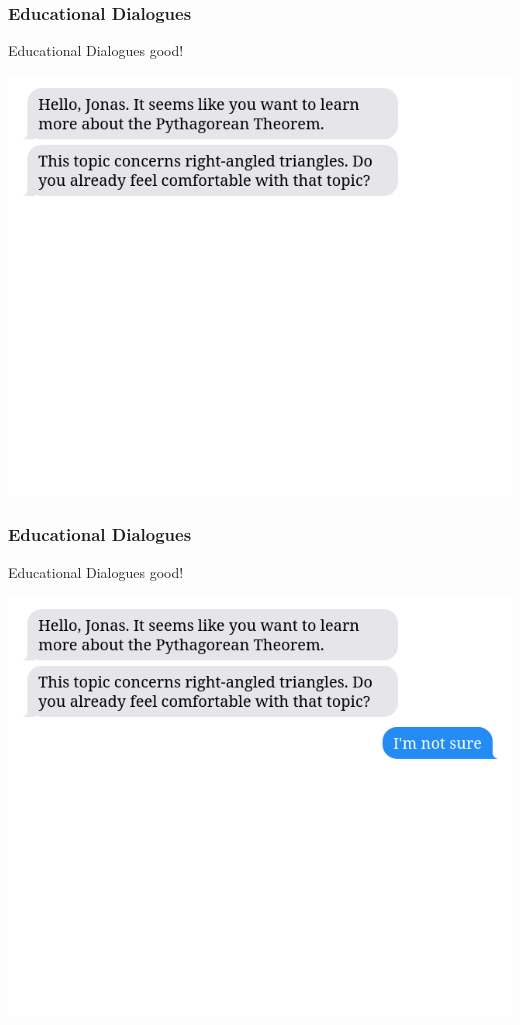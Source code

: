 \documentclass[aspectratio=169, usenames, dvipsnames]{beamer}
\begin{document}
\begin{frame}
\frametitle{Educational Dialogues}
\begin{minipage}{0.4\textwidth}
Educational Dialogues good!
\end{minipage}%
\begin{minipage}{0.6\textwidth}
\pause
\includegraphics[height=0.75\textheight,keepaspectratio]{images/bubbles_example_step1} 
\end{minipage}%
\end{frame}

\begin{frame}
\frametitle{Educational Dialogues}
\begin{minipage}{0.4\textwidth}
Educational Dialogues good!
\end{minipage}%
\begin{minipage}{0.6\textwidth}
\includegraphics[height=0.75\textheight,keepaspectratio]{images/bubbles_example_step2} 
\end{minipage}%
\end{frame}
\end{document}
